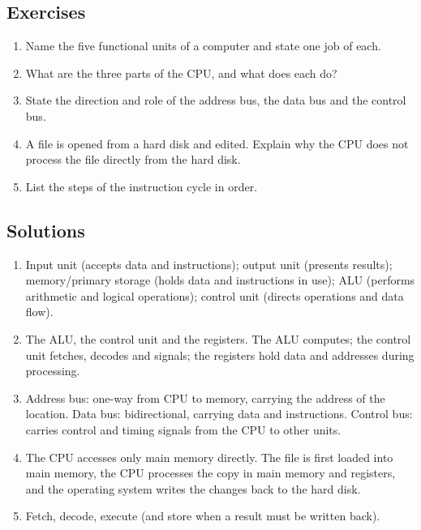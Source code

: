\subsection*{Exercises}
\begin{enumerate}[label=\arabic*.]
  \item Name the five functional units of a computer and state one job of
    each.
  \item What are the three parts of the CPU, and what does each do?
  \item State the direction and role of the address bus, the data bus and the
    control bus.
  \item A file is opened from a hard disk and edited. Explain why the CPU does
    not process the file directly from the hard disk.
  \item List the steps of the instruction cycle in order.
\end{enumerate}

\subsection*{Solutions}
\begingroup\small
\begin{enumerate}[label=\arabic*.]
  \item Input unit (accepts data and instructions); output unit (presents
    results); memory/primary storage (holds data and instructions in use);
    ALU (performs arithmetic and logical operations); control unit (directs
    operations and data flow).
  \item The ALU, the control unit and the registers. The ALU computes; the
    control unit fetches, decodes and signals; the registers hold data and
    addresses during processing.
  \item Address bus: one-way from CPU to memory, carrying the address of the
    location. Data bus: bidirectional, carrying data and instructions.
    Control bus: carries control and timing signals from the CPU to other
    units.
  \item The CPU accesses only main memory directly. The file is first loaded
    into main memory, the CPU processes the copy in main memory and registers,
    and the operating system writes the changes back to the hard disk.
  \item Fetch, decode, execute (and store when a result must be written back).
\end{enumerate}
\endgroup

